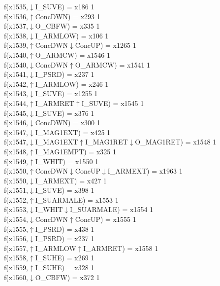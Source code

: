 f(x1535,$\downarrow$I\_SUVE) = x186 {1} \\
f(x1536,$\uparrow$ConcDWN) = x293 {1} \\
f(x1537,$\downarrow$O\_CBFW) = x335 {1} \\
f(x1538,$\downarrow$I\_ARMLOW) = x106 {1} \\
f(x1539,$\uparrow$ConcDWN$\downarrow$ConcUP) = x1265 {1} \\
f(x1540,$\uparrow$O\_ARMCW) = x1546 {1} \\
f(x1540,$\downarrow$ConcDWN$\uparrow$O\_ARMCW) = x1541 {1} \\
f(x1541,$\downarrow$I\_PSRD) = x237 {1} \\
f(x1542,$\uparrow$I\_ARMLOW) = x246 {1} \\
f(x1543,$\downarrow$I\_SUVE) = x1255 {1} \\
f(x1544,$\uparrow$I\_ARMRET$\uparrow$I\_SUVE) = x1545 {1} \\
f(x1545,$\downarrow$I\_SUVE) = x376 {1} \\
f(x1546,$\downarrow$ConcDWN) = x300 {1} \\
f(x1547,$\downarrow$I\_MAG1EXT) = x425 {1} \\
f(x1547,$\downarrow$I\_MAG1EXT$\uparrow$I\_MAG1RET$\downarrow$O\_MAG1RET) = x1548 {1} \\
f(x1548,$\uparrow$I\_MAG1EMPT) = x325 {1} \\
f(x1549,$\uparrow$I\_WHIT) = x1550 {1} \\
f(x1550,$\uparrow$ConcDWN$\downarrow$ConcUP$\downarrow$I\_ARMEXT) = x1963 {1} \\
f(x1550,$\downarrow$I\_ARMEXT) = x427 {1} \\
f(x1551,$\downarrow$I\_SUVE) = x398 {1} \\
f(x1552,$\uparrow$I\_SUARMALE) = x1553 {1} \\
f(x1553,$\downarrow$I\_WHIT$\downarrow$I\_SUARMALE) = x1554 {1} \\
f(x1554,$\downarrow$ConcDWN$\uparrow$ConcUP) = x1555 {1} \\
f(x1555,$\uparrow$I\_PSRD) = x438 {1} \\
f(x1556,$\downarrow$I\_PSRD) = x237 {1} \\
f(x1557,$\uparrow$I\_ARMLOW$\uparrow$I\_ARMRET) = x1558 {1} \\
f(x1558,$\uparrow$I\_SUHE) = x269 {1} \\
f(x1559,$\uparrow$I\_SUHE) = x328 {1} \\
f(x1560,$\downarrow$O\_CBFW) = x372 {1} \\
